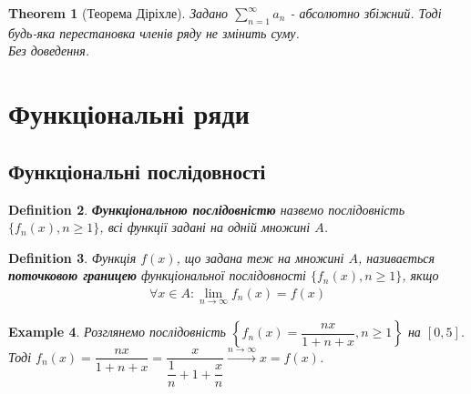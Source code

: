 \documentclass[a4paper, 10pt]{article}
\def\huge{\displaystyle}
\theoremstyle{theoremdd}
\newtheorem{theorem}{Theorem}[subsection]
\theoremstyle{theoremdd}
\theoremstyle{theoremdd}
\newtheorem{definition}[theorem]{Definition}
\theoremstyle{theoremdd}
\theoremstyle{theoremdd}
\newtheorem{example}[theorem]{Example}
\theoremstyle{theoremdd}
\theoremstyle{theoremdd}
\theoremstyle{theoremdd}
\theoremstyle{theoremdd}
\begin{document}
\begin{theorem}[Теорема Діріхле]
Задано $\huge \sum_{n=1}^\infty a_n$ - абсолютно збіжний. Тоді будь-яка перестановка членів ряду не змінить суму.\\
\textit{Без доведення.}
\end{theorem}
\newpage

\section{Функціональні ряди}
\subsection{Функціональні послідовності}
\begin{definition}
\textbf{Функціональною послідовністю} назвемо послідовність $\{f_n(x), n \geq 1 \}$, всі функції задані на одній множині $A$.
\end{definition}

\begin{definition}
Функція $f(x)$, що задана теж на множині $A$, називається \textbf{поточковою границею} функціональної послідовності $\{f_n(x), n \geq 1\}$, якщо
\begin{align*}
\forall x \in A: \lim_{n \to \infty} f_n(x) = f(x)
\end{align*}
\end{definition}

\begin{example}
Розглянемо послідовність $\left\{ f_n(x) = \dfrac{nx}{1+n+x}, n \geq 1 \right\}$ на $[0,5]$.\\
Тоді $f_n(x) = \dfrac{nx}{1+n+x} = \dfrac{x}{\dfrac{1}{n}+ 1 + \dfrac{x}{n}} \overset{n \to \infty}{\longrightarrow} x = f(x)$.
\end{example}
\end{document}
